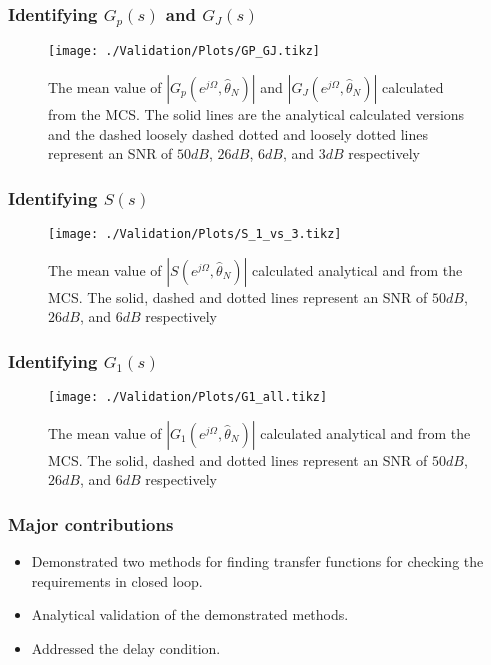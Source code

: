 \begin{frame}
	\frametitle{Identifying $G_p(s)$ and $G_J(s)$}
	\begin{figure}
		\texttt{[image: ./Validation/Plots/GP\_GJ.tikz]}
		\caption{The mean value of $|G_p(e^{j\Omega},\hat{\theta}_N)|$ and $|G_J(e^{j\Omega},\hat{\theta}_N)|$ calculated from the MCS\@. The solid lines are the analytical calculated versions and the dashed loosely dashed dotted and loosely dotted lines represent an SNR of $50dB$, $26dB$, $6dB$, and $3dB$ respectively}\label{fig:Gp_nl}
	\end{figure}
\end{frame}

\begin{frame}
	\frametitle{Identifying $S(s)$}
	\begin{figure}[tb]
		\texttt{[image: ./Validation/Plots/S\_1\_vs\_3.tikz]}
		\caption{The mean value of $|S(e^{j\Omega},\hat{\theta}_N)|$ calculated analytical and from the MCS\@. The solid, dashed and dotted lines represent an SNR of $50dB$, $26dB$, and $6dB$ respectively}\label{fig:S_1_vs_3}
	\end{figure}
\end{frame}

\begin{frame}
	\frametitle{Identifying $G_1(s)$}
	\begin{figure}[tb]
		\texttt{[image: ./Validation/Plots/G1\_all.tikz]}
		\caption{The mean value of $|G_1(e^{j\Omega},\hat{\theta}_N)|$ calculated analytical and from the MCS\@. The solid, dashed and dotted lines represent an SNR of $50dB$, $26dB$, and $6dB$ respectively}\label{fig:G1_all}
	\end{figure}
\end{frame}
\begin{frame}
	\frametitle{Major contributions}
	\begin{itemize}
		\item Demonstrated two methods for finding transfer functions for checking the requirements in closed loop.
		\item Analytical validation of the demonstrated methods.
		\item Addressed the delay condition.
	\end{itemize}
\end{frame}


